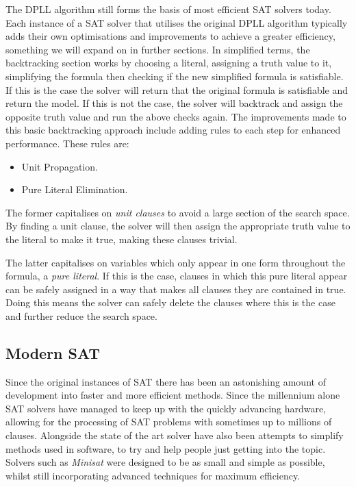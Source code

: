 \documentclass{article}
\begin{document}
The DPLL algorithm still forms the basis of most efficient SAT solvers today. Each instance of a SAT solver that utilises the
original DPLL algorithm typically adds their own optimisations and improvements to achieve a greater efficiency, something we
will expand on in further sections. In simplified terms, the backtracking section works by choosing a literal, assigning a truth
value to it, simplifying the formula then checking if the new simplified formula is satisfiable. If this is the case the solver
will return that the original formula is satisfiable and return the model. If this is not the case, the solver will backtrack and
assign the opposite truth value and run the above checks again. The improvements made to this basic backtracking approach include
adding rules to each step for enhanced performance. These rules are:

\begin{itemize}
    \item Unit Propagation.
    \item Pure Literal Elimination.
\end{itemize}

The former capitalises on \textit{unit clauses} to avoid a large section of the search space. By finding a unit clause, the
solver will then assign the appropriate truth value to the literal to make it true, making these clauses trivial.

The latter capitalises on variables which only appear in one form throughout the formula, a \textit{pure literal}. If this is
the case, clauses in which this pure literal appear can be safely assigned in a way that makes all clauses they are contained in
true. Doing this means the solver can safely delete the clauses where this is the case and further reduce the search space.

\subsection{Modern SAT}
Since the original instances of SAT there has been an astonishing amount of development into
faster and more efficient methods. Since the millennium alone SAT solvers have managed to keep up
with the quickly advancing hardware, allowing for the processing of SAT problems with sometimes up
to millions of clauses. Alongside the state of the art solver have also been attempts to simplify
methods used in software, to try and help people just getting into the topic. Solvers such as
\textit{Minisat} were designed to be as small and simple as possible, whilst still incorporating
advanced techniques for maximum efficiency.
\end{document}
